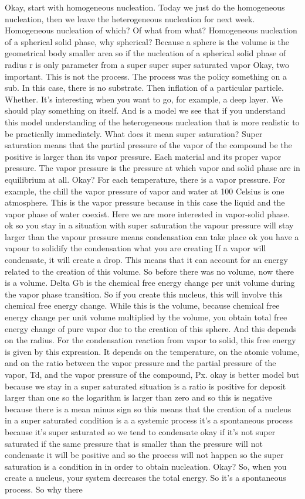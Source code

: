 Okay, start with homogeneous nucleation. Today we just do the homogeneous nucleation, then we leave the heterogeneous nucleation for next week. Homogeneous nucleation of which? Of what from what? Homogeneous nucleation of a spherical solid phase, why spherical? Because a sphere is the volume is the geometrical body smaller area so if the nucleation of a spherical solid phase of radius r is only parameter from a super super super saturated vapor Okay, two important. This is not the process. The process was the policy something on a sub. In this case, there is no substrate. Then inflation of a particular particle. Whether. It's interesting when you want to go, for example, a deep layer. We should play something on itself. And is a model we see that if you understand this model understanding of the heterogeneous nucleation that is more realistic to be practically immediately. What does it mean super saturation? Super saturation means that the partial pressure of the vapor of the compound be the positive is larger than its vapor pressure. Each material and its proper vapor pressure. The vapor pressure is the pressure at which vapor and solid phase are in equilibrium at all. Okay? For each temperature, there is a vapor pressure. For example, the chill the vapor pressure of vapor and water at 100 Celsius is one atmosphere. This is the vapor pressure because in this case the liquid and the vapor phase of water coexist. Here we are more interested in vapor-solid phase. ok so you stay in a situation with super saturation the vapour pressure will stay larger than the vapour pressure means condensation can take place ok you have a vapour to solidify the condensation what you are creating If a vapor will condensate, it will create a drop. This means that it can account for an energy related to the creation of this volume. So before there was no volume, now there is a volume. Delta Gb is the chemical free energy change per unit volume during the vapor phase transition. So if you create this nucleus, this will involve this chemical free energy change. While this is the volume, because chemical free energy change per unit volume multiplied by the volume, you obtain total free energy change of pure vapor due to the creation of this sphere. And this depends on the radius. For the condensation reaction from vapor to solid, this free energy is given by this expression. It depends on the temperature, on the atomic volume, and on the ratio between the vapor pressure and the partial pressure of the vapor, Td, and the vapor pressure of the compound, Px. okay is better model but because we stay in a super saturated situation is a ratio is positive for deposit larger than one so the logarithm is larger than zero and so this is negative because there is a mean minus sign so this means that the creation of a nucleus in a super saturated condition is a a systemic process it's a spontaneous process because it's super saturated so we tend to condensate okay if it's not super saturated if the same pressure that is smaller than the pressure will not condensate it will be positive and so the process will not happen so the super saturation is a condition in in order to obtain nucleation. Okay? So, when you create a nucleus, your system decreases the total energy. So it's a spontaneous process. So why there 